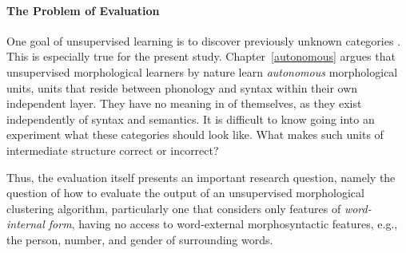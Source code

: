 
\paragraph{The Problem of Evaluation}  One goal of unsupervised learning is to discover previously unknown categories \citep{parsons:2004}. This is especially true for the present study. Chapter~\ref{autonomous} argues that unsupervised morphological learners by nature learn \emph{autonomous} morphological units, units that reside between phonology and syntax within their own independent layer. They have no meaning in of themselves, as they exist independently of syntax and semantics. It is difficult to know going into an experiment what these categories should look like. What makes such units of intermediate structure correct or incorrect? 

%

Thus, the evaluation itself presents an important research question, namely the question of how to evaluate the output of an unsupervised morphological clustering algorithm, particularly one that considers only features of \emph{word-internal form}, having no access to word-external morphosyntactic features, e.g., the person, number, and gender of  surrounding words.

